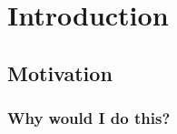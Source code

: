 \chapter{Introduction}
\lipsum[1-2]
\section{Motivation}
\lipsum[3]
\subsection{Why would I do this?}
\lipsum[4]
